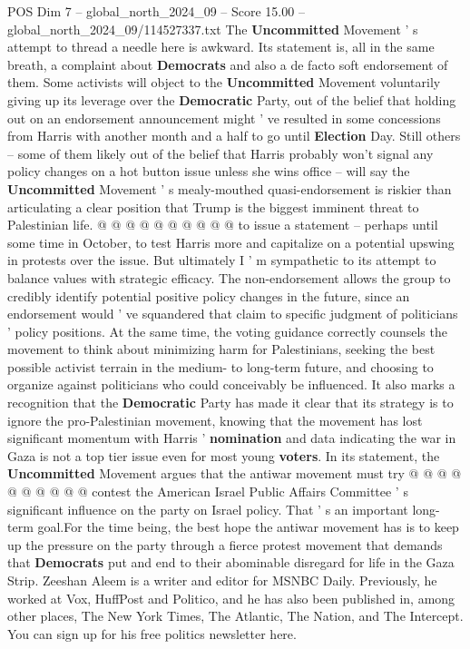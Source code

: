 \begin{textsample}{POS Dim 7 – global\_north\_2024\_09 – Score 15.00 – global\_north\_2024\_09/114527337.txt}
The \textbf{Uncommitted} Movement ' s attempt to thread a needle here is awkward.
Its statement is, all in the same breath, a complaint about \textbf{Democrats} and also a de facto soft endorsement of them.
Some activists will object to the \textbf{Uncommitted} Movement voluntarily giving up its leverage over the \textbf{Democratic} Party, out of the belief that holding out on an endorsement announcement might ' ve resulted in some concessions from Harris with another month and a half to go until \textbf{Election} Day.
Still others -- some of them likely out of the belief that Harris probably won't signal any policy changes on a hot button issue unless she wins office -- will say the \textbf{Uncommitted} Movement ' s mealy-mouthed quasi-endorsement is riskier than articulating a clear position that Trump is the biggest imminent threat to Palestinian life. @ @ @ @ @ @ @ @ @ @ to issue a statement -- perhaps until some time in October, to test Harris more and capitalize on a potential upswing in protests over the issue.
But ultimately I ' m sympathetic to its attempt to balance values with strategic efficacy.
The non-endorsement allows the group to credibly identify potential positive policy changes in the future, since an endorsement would ' ve squandered that claim to specific judgment of politicians ' policy positions.
At the same time, the voting guidance correctly counsels the movement to think about minimizing harm for Palestinians, seeking the best possible activist terrain in the medium- to long-term future, and choosing to organize against politicians who could conceivably be influenced.
It also marks a recognition that the \textbf{Democratic} Party has made it clear that its strategy is to ignore the pro-Palestinian movement, knowing that the movement has lost significant momentum with Harris ' \textbf{nomination} and data indicating the war in Gaza is not a top tier issue even for most young \textbf{voters}.
In its statement, the \textbf{Uncommitted} Movement argues that the antiwar movement must try @ @ @ @ @ @ @ @ @ @ contest the American Israel Public Affairs Committee ' s significant influence on the party on Israel policy.
That ' s an important long-term goal.For the time being, the best hope the antiwar movement has is to keep up the pressure on the party through a fierce protest movement that demands that \textbf{Democrats} put and end to their abominable disregard for life in the Gaza Strip.
Zeeshan Aleem is a writer and editor for MSNBC Daily.
Previously, he worked at Vox, HuffPost and Politico, and he has also been published in, among other places, The New York Times, The Atlantic, The Nation, and The Intercept.
You can sign up for his free politics newsletter here.

\end{textsample}

